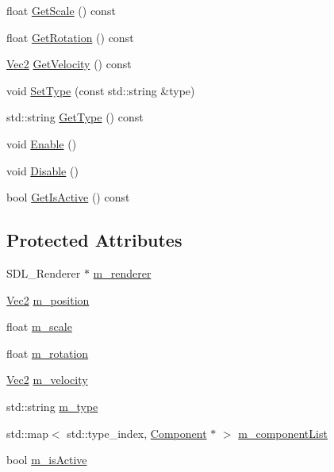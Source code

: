 \begin{DoxyCompactItemize}
\item 
float \mbox{\hyperlink{class_entity_a56a2203cb76f5a4cd8c16f0f8ce18b57}{Get\+Scale}} () const
\item 
float \mbox{\hyperlink{class_entity_ab5e5cf79cf2ce961c23061798488bcc4}{Get\+Rotation}} () const
\item 
\mbox{\hyperlink{struct_vec2}{Vec2}} \mbox{\hyperlink{class_entity_a020e999dbfc6b04eb7981b1f2496c4f1}{Get\+Velocity}} () const
\item 
void \mbox{\hyperlink{class_entity_a3320db922c2e6a1392144e14c3d6af91}{Set\+Type}} (const std\+::string \&type)
\item 
std\+::string \mbox{\hyperlink{class_entity_a906ca5c844298c0258bda83563f925a0}{Get\+Type}} () const
\item 
void \mbox{\hyperlink{class_entity_ad940b54ddb93e1b2cc72012589576478}{Enable}} ()
\item 
void \mbox{\hyperlink{class_entity_a60976526014b5f8d65666cd51740d421}{Disable}} ()
\item 
bool \mbox{\hyperlink{class_entity_a98ee6f61ed846d661e5e660d9f4d7e10}{Get\+Is\+Active}} () const
\end{DoxyCompactItemize}
\subsection*{Protected Attributes}
\begin{DoxyCompactItemize}
\item 
S\+D\+L\+\_\+\+Renderer $\ast$ \mbox{\hyperlink{class_entity_a797ca76b3015996cbeb3225eff168cfa}{m\+\_\+renderer}}
\item 
\mbox{\hyperlink{struct_vec2}{Vec2}} \mbox{\hyperlink{class_entity_af1dc457432910811ea84e53dc1aedffc}{m\+\_\+position}}
\item 
float \mbox{\hyperlink{class_entity_a044400bb406b1494de4013a6df8a5933}{m\+\_\+scale}}
\item 
float \mbox{\hyperlink{class_entity_aa3ffa7fffee42fdf090ce02b56d6f305}{m\+\_\+rotation}}
\item 
\mbox{\hyperlink{struct_vec2}{Vec2}} \mbox{\hyperlink{class_entity_ae284f1957cfefc2bd7fd02812a1ee62e}{m\+\_\+velocity}}
\item 
std\+::string \mbox{\hyperlink{class_entity_ab0e743c5f841392748e675c43d3a33c4}{m\+\_\+type}}
\item 
std\+::map$<$ std\+::type\+\_\+index, \mbox{\hyperlink{class_component}{Component}} $\ast$ $>$ \mbox{\hyperlink{class_entity_a5f53550a89ee6303d64c8de9e3ade02a}{m\+\_\+component\+List}}
\item 
bool \mbox{\hyperlink{class_entity_a1e67bc72cc50f2be6903cfa23b25f3df}{m\+\_\+is\+Active}}
\end{DoxyCompactItemize}


